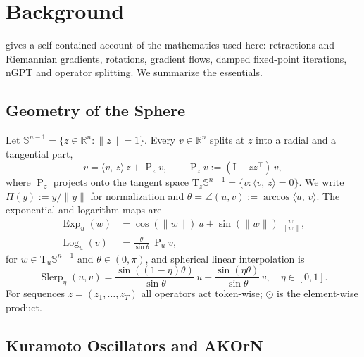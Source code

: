 \documentclass{article}
\theoremstyle{plain}
\theoremstyle{definition}
\theoremstyle{remark}
\newcommand{\R}{\mathbb{R}}
\newcommand{\Sph}{\mathbb{S}}
\newcommand{\ip}[2]{\langle #1,\, #2\rangle}
\newcommand{\norm}[1]{\lVert #1\rVert}
\newcommand{\Proj}{\operatorname{P}}
\newcommand{\Ret}{\Pi}
\newcommand{\Slerp}{\operatorname{Slerp}}
\newcommand{\Exp}{\operatorname{Exp}}
\newcommand{\Log}{\operatorname{Log}}
\newcommand{\Id}{\mathrm{I}}
\newcommand{\tang}{\mathrm{T}}
\begin{document}
\section{Background}
\label{sec:background}

 gives a self-contained account of the mathematics used here: retractions and
Riemannian gradients, rotations, gradient flows, damped fixed-point iterations, nGPT and operator
splitting. We summarize the essentials.

\subsection{Geometry of the Sphere}
\label{sec:geometry}

Let $\Sph^{n-1}=\{z\in\R^n:\norm{z}=1\}$. Every $v\in\R^n$ splits at $z$ into a radial and a
tangential part,
\begin{equation}
  v = \ip{v}{z}\,z + \Proj_z v,\qquad \Proj_z v := (\Id-zz^\top)\,v,
  \label{eq:proj}
\end{equation}
where $\Proj_z$ projects onto the tangent space $\tang_z\Sph^{n-1}=\{v:\ip{v}{z}=0\}$. We write
$\Ret(y):=y/\norm{y}$ for normalization and $\theta=\angle(u,v):=\arccos\ip{u}{v}$. The exponential
and logarithm maps are
\begin{align}
  \Exp_u(w) &= \cos(\norm{w})\,u+\sin(\norm{w})\,\tfrac{w}{\norm{w}},\\
  \Log_u(v) &= \tfrac{\theta}{\sin\theta}\,\Proj_u v,
\end{align}
for $w\in\tang_u\Sph^{n-1}$ and $\theta\in(0,\pi)$,
and spherical linear interpolation is
\begin{equation}
  \Slerp_\eta(u,v) = \frac{\sin((1-\eta)\theta)}{\sin\theta}\,u + \frac{\sin(\eta\theta)}{\sin\theta}\,v,
  \quad \eta\in[0,1].
  \label{eq:slerp}
\end{equation}
For sequences $z=(z_1,\dots,z_T)$ all operators act token-wise; $\odot$ is the element-wise product.

\subsection{Kuramoto Oscillators and AKOrN}
\label{sec:akorn}
\end{document}
